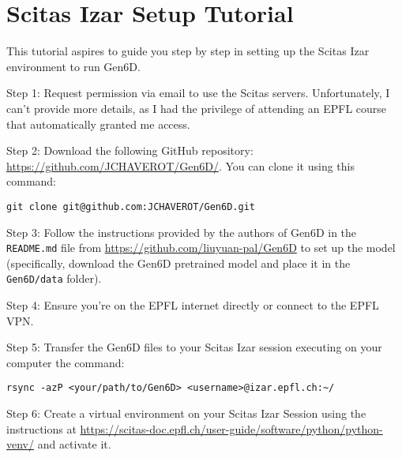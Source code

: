 \chapter{Scitas Izar Setup Tutorial}\label{chapter:scitas}

This tutorial aspires to guide you step by step in setting up the Scitas Izar environment to run Gen6D.

\bigskip
\bigskip

\noindent Step 1: Request permission via email to use the Scitas servers. Unfortunately, I can't provide more details, as I had the privilege of attending an EPFL course that automatically granted me access.

\bigskip


\noindent Step 2: Download the following GitHub repository: \\ \url{https://github.com/JCHAVEROT/Gen6D/}. You can clone it using this command:
{ \captionsetup{labelformat=empty,labelsep=none}
\begin{lstlisting}[style=bashstyle, caption=\null]
	git clone git@github.com:JCHAVEROT/Gen6D.git
\end{lstlisting}
}

\vspace{-0.4cm}

\noindent Step 3: Follow the instructions provided by the authors of Gen6D in the \texttt{README.md} file from \url{https://github.com/liuyuan-pal/Gen6D} to set up the model (specifically, download the Gen6D pretrained model and place it in the \texttt{Gen6D/data} folder).

\bigskip


\noindent Step 4: Ensure you're on the EPFL internet directly or connect to the EPFL VPN.

\bigskip


\noindent Step 5: Transfer the Gen6D files to your Scitas Izar session executing on your computer the command:
{ \captionsetup{labelformat=empty,labelsep=none}
\begin{lstlisting}[style=bashstyle, caption=\null]
	rsync -azP <your/path/to/Gen6D> <username>@izar.epfl.ch:~/
\end{lstlisting}
}

\vspace{-0.4cm}

\noindent Step 6: Create a virtual environment on your Scitas Izar Session using the instructions at \url{https://scitas-doc.epfl.ch/user-guide/software/python/python-venv/} and activate it.


